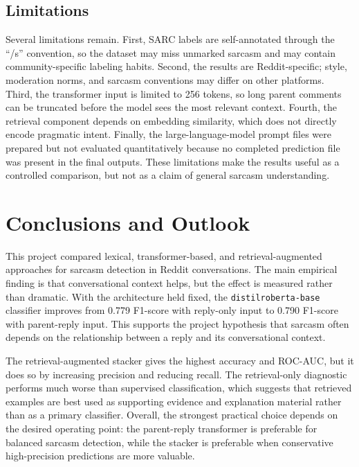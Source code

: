 \documentclass[%
 reprint,
 amsmath,amssymb,
 aps,
]{revtex4-2}
\begin{document}
\subsection*{Limitations}

Several limitations remain. First, SARC labels are self-annotated through the ``/s'' convention, so the dataset may miss unmarked sarcasm and may contain community-specific labeling habits. Second, the results are Reddit-specific; style, moderation norms, and sarcasm conventions may differ on other platforms. Third, the transformer input is limited to 256 tokens, so long parent comments can be truncated before the model sees the most relevant context. Fourth, the retrieval component depends on embedding similarity, which does not directly encode pragmatic intent. Finally, the large-language-model prompt files were prepared but not evaluated quantitatively because no completed prediction file was present in the final outputs. These limitations make the results useful as a controlled comparison, but not as a claim of general sarcasm understanding.

\section{\label{sec:conclusion}Conclusions and Outlook} %

This project compared lexical, transformer-based, and retrieval-augmented approaches for sarcasm detection in Reddit conversations. The main empirical finding is that conversational context helps, but the effect is measured rather than dramatic. With the architecture held fixed, the \texttt{distilroberta-base} classifier improves from 0.779 F1-score with reply-only input to 0.790 F1-score with parent-reply input. This supports the project hypothesis that sarcasm often depends on the relationship between a reply and its conversational context.

The retrieval-augmented stacker gives the highest accuracy and ROC-AUC, but it does so by increasing precision and reducing recall. The retrieval-only diagnostic performs much worse than supervised classification, which suggests that retrieved examples are best used as supporting evidence and explanation material rather than as a primary classifier. Overall, the strongest practical choice depends on the desired operating point: the parent-reply transformer is preferable for balanced sarcasm detection, while the stacker is preferable when conservative high-precision predictions are more valuable.
\end{document}
